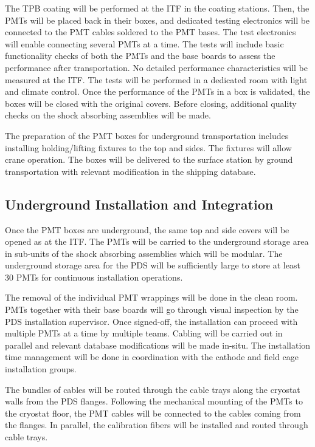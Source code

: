 The TPB coating will be performed at the ITF in the coating stations. Then, the PMTs will be placed back in their boxes, and dedicated testing electronics will be connected to the PMT cables soldered to the PMT bases. The test electronics will enable connecting several PMTs at a time. The tests will include basic functionality checks of both the PMTs and the base boards to assess the performance after transportation. No detailed performance characteristics will be measured at the ITF. The tests will be performed in a dedicated room with light and climate control. Once the performance of the PMTs in a box is validated, the boxes will be closed with the original covers. Before closing, additional quality checks on the shock absorbing assemblies will be made.

The preparation of the PMT boxes for underground transportation includes installing holding/lifting fixtures to the top and sides. The fixtures will allow crane operation. The boxes will be delivered to the surface station by ground transportation with relevant modification in the shipping database.

\subsection{Underground Installation and Integration}
\label{sec:fddp-pd-9.3}

Once the PMT boxes are underground, the same top and side covers will be opened as at the ITF. The PMTs will be carried to the underground storage area in sub-units of the shock absorbing assemblies which will be modular. The underground storage area for the PDS will be sufficiently large to store at least \num{30} PMTs for continuous installation operations.

The removal of the individual PMT wrappings will be done in the clean room. PMTs together with their base boards will go through visual inspection by the PDS installation supervisor. Once signed-off, the installation can proceed with multiple PMTs at a time by multiple teams. Cabling will be carried out in parallel and relevant database modifications will be made in-situ. The installation time management will be done in coordination with the cathode and field cage installation groups.

The bundles of cables will be routed through the cable trays along the cryostat walls from the PDS flanges. Following the mechanical mounting of the PMTs to the cryostat floor, the PMT cables will be 
connected to the cables coming from the flanges. In parallel, the calibration fibers will be installed and routed through cable trays.

